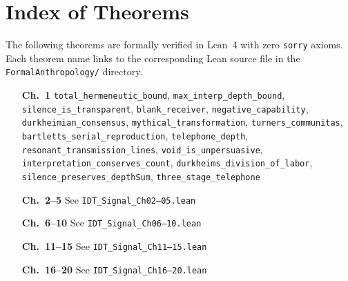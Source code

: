 \documentclass[11pt,twoside]{book}
\theoremstyle{plain}
\theoremstyle{definition}
\theoremstyle{remark}
\begin{document}
\chapter*{Index of Theorems}

The following theorems are formally verified in Lean~4 with zero
\texttt{sorry} axioms. Each theorem name links to the corresponding
Lean source file in the \texttt{FormalAnthropology/} directory.

\begin{small}
\begin{enumerate}
\item[\textbf{Ch.~1}] \texttt{total\_hermeneutic\_bound}, \texttt{max\_interp\_depth\_bound}, \texttt{silence\_is\_transparent}, \texttt{blank\_receiver}, \texttt{negative\_capability}, \texttt{durkheimian\_consensus}, \texttt{mythical\_transformation}, \texttt{turners\_communitas}, \texttt{bartletts\_serial\_reproduction}, \texttt{telephone\_depth}, \texttt{resonant\_transmission\_lines}, \texttt{void\_is\_unpersuasive}, \texttt{interpretation\_conserves\_count}, \texttt{durkheims\_division\_of\_labor}, \texttt{silence\_preserves\_depthSum}, \texttt{three\_stage\_telephone}

\item[\textbf{Ch.~2--5}] See \texttt{IDT\_Signal\_Ch02--05.lean}
\item[\textbf{Ch.~6--10}] See \texttt{IDT\_Signal\_Ch06--10.lean}
\item[\textbf{Ch.~11--15}] See \texttt{IDT\_Signal\_Ch11--15.lean}
\item[\textbf{Ch.~16--20}] See \texttt{IDT\_Signal\_Ch16--20.lean}
\end{enumerate}
\end{small}
\end{document}
